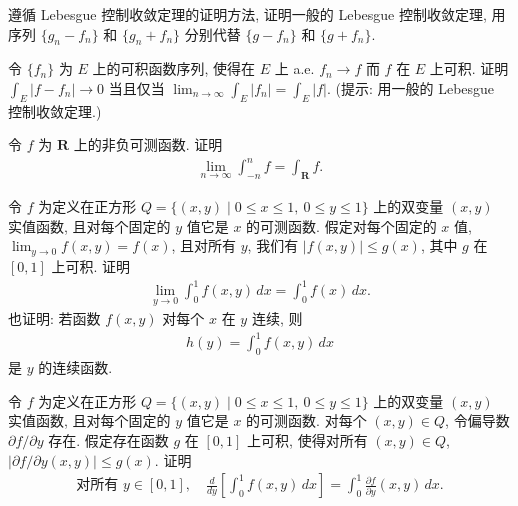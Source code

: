 \documentclass[../../main.tex]{subfiles}
\begin{document}
\begin{exercise}\label{exercise:ch04-32}
遵循 Lebesgue 控制收敛定理的证明方法, 证明一般的 Lebesgue 控制收敛定理, 用序列 $\{g_{n}-f_{n}\}$ 和 $\{g_{n}+f_{n}\}$ 分别代替 $\{g-f_{n}\}$ 和 $\{g+f_{n}\}$.
\end{exercise}

\begin{exercise}\label{exercise:ch04-33}
令 $\{f_{n}\}$ 为 $E$ 上的可积函数序列, 使得在 $E$ 上 a.e. $f_{n}\to f$ 而 $f$ 在 $E$ 上可积. 证明 $\int_{E}|f-f_{n}|\to 0$ 当且仅当 $\lim_{n\to\infty}\int_{E}|f_{n}|=\int_{E}|f|$. (提示: 用一般的 Lebesgue 控制收敛定理.)
\end{exercise}

\begin{exercise}\label{exercise:ch04-34}
令 $f$ 为 $\mathbf{R}$ 上的非负可测函数. 证明
\begin{align*}
\lim_{n\to\infty}\int_{-n}^{n}f=\int_{\mathbf{R}}f.
\end{align*}
\end{exercise}

\begin{exercise}\label{exercise:ch04-35}
令 $f$ 为定义在正方形 $Q=\{(x,y)\mid 0\leqslant x\leqslant 1,\ 0\leqslant y\leqslant 1\}$ 上的双变量 $(x,y)$ 实值函数, 且对每个固定的 $y$ 值它是 $x$ 的可测函数. 假定对每个固定的 $x$ 值, $\lim_{y\to 0}f(x,y)=f(x)$, 且对所有 $y$, 我们有 $|f(x,y)|\leqslant g(x)$, 其中 $g$ 在 $[0,1]$ 上可积. 证明
\begin{align*}
\lim_{y\to 0}\int_{0}^{1}f(x,y)\,dx=\int_{0}^{1}f(x)\,dx.
\end{align*}
也证明: 若函数 $f(x,y)$ 对每个 $x$ 在 $y$ 连续, 则
\begin{align*}
h(y)=\int_{0}^{1}f(x,y)\,dx
\end{align*}
是 $y$ 的连续函数.
\end{exercise}

\begin{exercise}\label{exercise:ch04-36}
令 $f$ 为定义在正方形 $Q=\{(x,y)\mid 0\leqslant x\leqslant 1,\ 0\leqslant y\leqslant 1\}$ 上的双变量 $(x,y)$ 实值函数, 且对每个固定的 $y$ 值它是 $x$ 的可测函数. 对每个 $(x,y)\in Q$, 令偏导数 $\partial f/\partial y$ 存在. 假定存在函数 $g$ 在 $[0,1]$ 上可积, 使得对所有 $(x,y)\in Q$, $|\partial f/\partial y(x,y)|\leqslant g(x)$. 证明
\begin{align*}
\text{对所有 }y\in[0,1],\quad\frac{d}{dy}\left[\int_{0}^{1}f(x,y)\,dx\right]=\int_{0}^{1}\frac{\partial f}{\partial y}(x,y)\,dx.
\end{align*}
\end{exercise}
\end{document}

